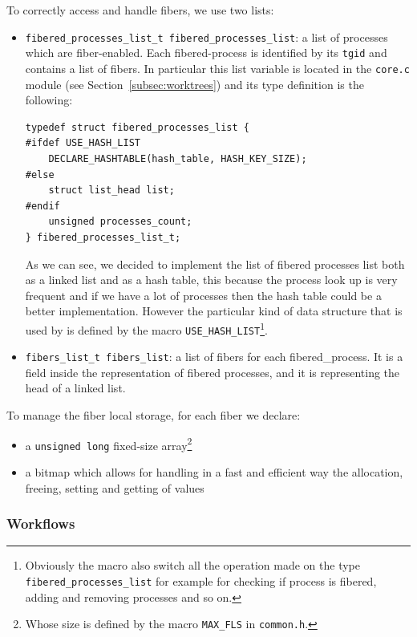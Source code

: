 \documentclass[a4paper,10pt]{article}
\begin{document}
  To correctly access and handle fibers, we use two lists:
  \begin{itemize}
    \item \lstinline{fibered_processes_list_t fibered_processes_list}: a list of processes which are fiber-enabled. Each fibered-process is identified by its \lstinline{tgid} and contains a list of fibers. In particular this list variable is located in the \lstinline{core.c} module (see Section~\ref{subsec:worktrees}) and its type definition is the following:

          \begin{lstlisting}[frame=trBL]
typedef struct fibered_processes_list {
#ifdef USE_HASH_LIST
    DECLARE_HASHTABLE(hash_table, HASH_KEY_SIZE);
#else
    struct list_head list;
#endif
    unsigned processes_count;
} fibered_processes_list_t;
          \end{lstlisting}

          As we can see, we decided to implement the list of fibered processes list both as a linked list and as a hash table, this because the process look up is very frequent and if we have a lot of processes then the hash table could be a better implementation. However the particular kind of data structure that is used by is defined by the macro \lstinline{USE_HASH_LIST}\footnote{Obviously the macro also switch all the operation made on the type \lstinline{fibered_processes_list} for example for checking if process is fibered, adding and removing processes and so on.}.

    \item \lstinline{fibers_list_t fibers_list}: a list of fibers for each fibered\_process. It is a field inside the representation of fibered processes, and it is representing the head of a linked list.
  \end{itemize}

  To manage the fiber local storage, for each fiber we declare:
  \begin{itemize}
    \item a \lstinline{unsigned long} fixed-size array\footnote{Whose size is defined by the macro \lstinline{MAX_FLS} in \lstinline{common.h}.}
    \item a bitmap which allows for handling in a fast and efficient way the allocation, freeing, setting and getting of values
  \end{itemize}

\subsubsection{Workflows}
\end{document}
